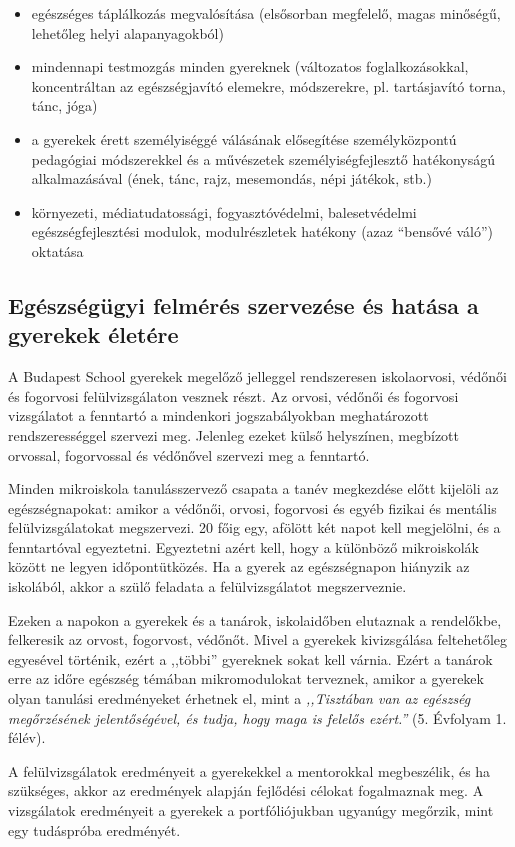 \begin{itemize}

    \item
          egészséges táplálkozás megvalósítása (elsősorban megfelelő, magas minőségű, lehetőleg helyi alapanyagokból)
    \item
          mindennapi testmozgás minden gyereknek (változatos foglalkozásokkal, koncentráltan az egészségjavító elemekre, módszerekre, pl. tartásjavító torna, tánc, jóga)
    \item
          a gyerekek érett személyiséggé válásának elősegítése személyközpontú pedagógiai módszerekkel és a művészetek személyiségfejlesztő hatékonyságú alkalmazásával (ének, tánc, rajz, mesemondás, népi játékok, stb.)
    \item
          környezeti, médiatudatossági, fogyasztóvédelmi, balesetvédelmi egészségfejlesztési modulok, modulrészletek hatékony (azaz ``bensővé váló'') oktatása
\end{itemize}

\subsection{Egészségügyi felmérés szervezése és hatása a gyerekek életére}
A Budapest School gyerekek megelőző jelleggel rendszeresen iskolaorvosi, védőnői és fogorvosi felülvizsgálaton vesznek részt.  Az orvosi, védőnői és fogorvosi vizsgálatot a fenntartó a mindenkori jogszabályokban meghatározott rendszerességgel szervezi meg. Jelenleg ezeket külső helyszínen, megbízott orvossal, fogorvossal és védőnővel szervezi meg a fenntartó.
 
Minden mikroiskola tanulásszervező csapata a tanév megkezdése előtt kijelöli az egészségnapokat: amikor a védőnői, orvosi, fogorvosi és egyéb fizikai és mentális felülvizsgálatokat megszervezi. 20 főig egy, afölött két napot kell megjelölni, és a fenntartóval egyeztetni. Egyeztetni azért kell, hogy a különböző mikroiskolák között ne legyen időpontütközés. Ha a gyerek az egészségnapon hiányzik az iskolából, akkor a szülő feladata a felülvizsgálatot megszerveznie.
 
Ezeken a napokon a gyerekek és a tanárok, iskolaidőben elutaznak a rendelőkbe, felkeresik az orvost, fogorvost, védőnőt. Mivel a gyerekek kivizsgálása feltehetőleg egyesével történik, ezért a ,,többi” gyereknek sokat kell várnia. Ezért a tanárok erre az időre egészség témában mikromodulokat terveznek, amikor a gyerekek olyan tanulási eredményeket érhetnek el, mint a \emph{,,Tisztában van az egészség megőrzésének jelentőségével, és tudja, hogy maga is felelős ezért.''} (5. Évfolyam 1. félév).
 
A felülvizsgálatok eredményeit a gyerekekkel a mentorokkal megbeszélik, és ha szükséges, akkor az eredmények alapján fejlődési célokat fogalmaznak meg. A vizsgálatok eredményeit a gyerekek a portfóliójukban ugyanúgy megőrzik, mint egy tudáspróba eredményét.
 
